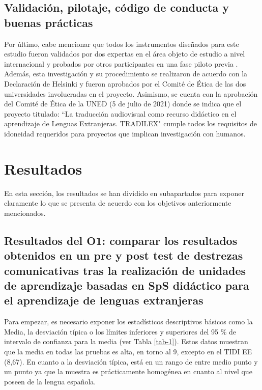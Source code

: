 \documentclass[spanish]{textolivre}
\begin{document}
\subsection{Validación, pilotaje, código de conducta y buenas prácticas}\label{3.5}
Por último, cabe mencionar que todos los instrumentos diseñados para este estudio fueron validados por dos expertas en el área objeto de estudio a nivel internacional y probados por otros participantes en una fase piloto previa \cite{couto-cantero2021}. Además, esta investigación y su procedimiento se realizaron de acuerdo con la Declaración de Helsinki y fueron aprobados por el Comité de Ética de las dos universidades involucradas en el proyecto. Asimismo, se cuenta con la aprobación del Comité de Ética de la UNED (5 de julio de 2021) donde se indica que el proyecto titulado: ``La traducción audiovisual como recurso didáctico en el aprendizaje de Lenguas Extranjeras. TRADILEX" cumple todos los requisitos de idoneidad requeridos para proyectos que implican investigación con humanos.

\section{Resultados}\label{resultados}
En esta sección, los resultados se han dividido en subapartados para exponer claramente lo que se presenta de acuerdo con los objetivos anteriormente mencionados.

\subsection{Resultados del O1: comparar los resultados obtenidos en un pre y post test de destrezas comunicativas tras la realización de unidades de aprendizaje basadas en SpS didáctico para el aprendizaje de lenguas extranjeras}\label{sec-4.1}
Para empezar, es necesario exponer los estadísticos descriptivos básicos como la Media, la desviación típica o los límites inferiores y superiores del 95 \% de intervalo de confianza para la media (ver Tabla \ref{tab-1}). Estos datos muestran que la media en todas las pruebas es alta, en torno al 9, excepto en el TIDI EE (8,67). En cuanto a la desviación típica, está en un rango de entre medio punto y un punto ya que la muestra es prácticamente homogénea en cuanto al nivel que poseen de la lengua española.
\end{document}
